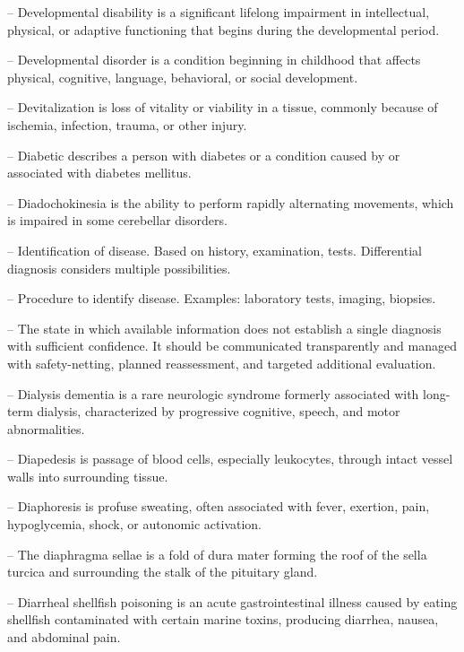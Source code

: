 -- Developmental disability is a significant lifelong impairment in intellectual, physical, or adaptive functioning that begins during the developmental period.

-- Developmental disorder is a condition beginning in childhood that affects physical, cognitive, language, behavioral, or social development.

-- Devitalization is loss of vitality or viability in a tissue, commonly because of ischemia, infection, trauma, or other injury.

-- Diabetic describes a person with diabetes or a condition caused by or associated with diabetes mellitus.

-- Diadochokinesia is the ability to perform rapidly alternating movements, which is impaired in some cerebellar disorders.

-- Identification of disease. Based on history, examination, tests. Differential diagnosis considers multiple possibilities.

-- Procedure to identify disease. Examples: laboratory tests, imaging, biopsies.

-- The state in which available information does not establish a single diagnosis with sufficient confidence. It should be communicated transparently and managed with safety-netting, planned reassessment, and targeted additional evaluation.

-- Dialysis dementia is a rare neurologic syndrome formerly associated with long-term dialysis, characterized by progressive cognitive, speech, and motor abnormalities.

-- Diapedesis is passage of blood cells, especially leukocytes, through intact vessel walls into surrounding tissue.

-- Diaphoresis is profuse sweating, often associated with fever, exertion, pain, hypoglycemia, shock, or autonomic activation.

-- The diaphragma sellae is a fold of dura mater forming the roof of the sella turcica and surrounding the stalk of the pituitary gland.

-- Diarrheal shellfish poisoning is an acute gastrointestinal illness caused by eating shellfish contaminated with certain marine toxins, producing diarrhea, nausea, and abdominal pain.

